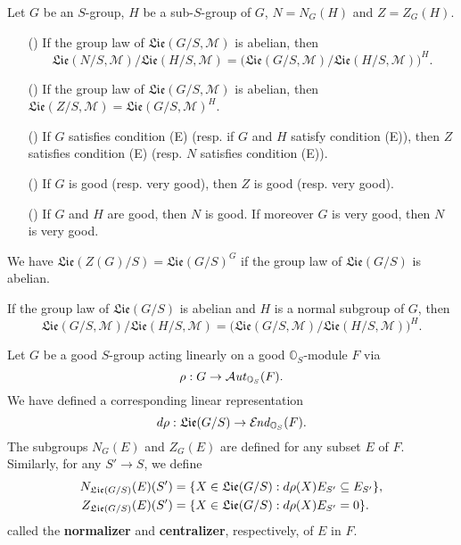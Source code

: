 \begin{theorem}\label{scheme group normalizer and centralizer Lie prop}
Let $G$ be an $S$-group, $H$ be a sub-$S$-group of $G$, $N=N_G(H)$ and $Z=Z_G(H)$.
\begin{enumerate}
    \item[(\rmnum{1})] If the group law of $\mathfrak{Lie}(G/S,\mathscr{M})$ is abelian, then
    \[\mathfrak{Lie}(N/S,\mathscr{M})/\mathfrak{Lie}(H/S,\mathscr{M})=\big(\mathfrak{Lie}(G/S,\mathscr{M})/\mathfrak{Lie}(H/S,\mathscr{M})\big)^H.\]
    \item[(\rmnum{2})] If the group law of $\mathfrak{Lie}(G/S,\mathscr{M})$ is abelian, then $\mathfrak{Lie}(Z/S,\mathscr{M})=\mathfrak{Lie}(G/S,\mathscr{M})^H$.
    \item[(\rmnum{3})] If $G$ satisfies condition (E) (resp. if $G$ and $H$ satisfy condition (E)), then $Z$ satisfies condition (E) (resp. $N$ satisfies condition (E)).
    \item[(\rmnum{4})] If $G$ is good (resp. very good), then $Z$ is good (resp. very good).
    \item[(\rmnum{5})] If $G$ and $H$ are good, then $N$ is good. If moreover $G$ is very good, then $N$ is very good.
\end{enumerate}
\end{theorem}

\begin{corollary}\label{scheme group Lie of centralizer char}
We have $\mathfrak{Lie}(Z(G)/S)=\mathfrak{Lie}(G/S)^G$ if the group law of $\mathfrak{Lie}(G/S)$ is abelian.
\end{corollary}

\begin{corollary}\label{scheme group normal subgroup Lie invariant under Ad}
If the group law of $\mathfrak{Lie}(G/S)$ is abelian and $H$ is a normal subgroup of $G$, then
\[\mathfrak{Lie}(G/S,\mathscr{M})/\mathfrak{Lie}(H/S,\mathscr{M})=\big(\mathfrak{Lie}(G/S,\mathscr{M})/\mathfrak{Lie}(H/S,\mathscr{M})\big)^H.\]
\end{corollary}

Let $G$ be a good $S$-group acting linearly on a good $\mathbb{O}_S$-module $F$ via
\[\rho:G\to\operatorname{\mathcal{A}\hspace*{-0.2pt}\textit{ut}\hspace{0.5pt}}_{\mathbb{O}_S}(F).\]
We have defined a corresponding linear representation
\[d\rho:\mathfrak{Lie}(G/S)\to\operatorname{\mathcal{E}\hspace*{-1pt}\textit{nd}\hspace{0.5pt}}_{\mathbb{O}_S}(F).\]
The subgroups $N_G(E)$ and $Z_G(E)$ are defined for any subset $E$ of $F$. Similarly, for any $S'\to S$, we define
\begin{align*}
N_{\mathfrak{Lie}(G/S)}(E)(S')&=\{X\in\mathfrak{Lie}(G/S):d\rho(X)E_{S'}\subseteq E_{S'}\},\\
Z_{\mathfrak{Lie}(G/S)}(E)(S')&=\{X\in\mathfrak{Lie}(G/S):d\rho(X)E_{S'}=0\}.
\end{align*}
called the \textbf{normalizer} and \textbf{centralizer}, respectively, of $E$ in $F$.

